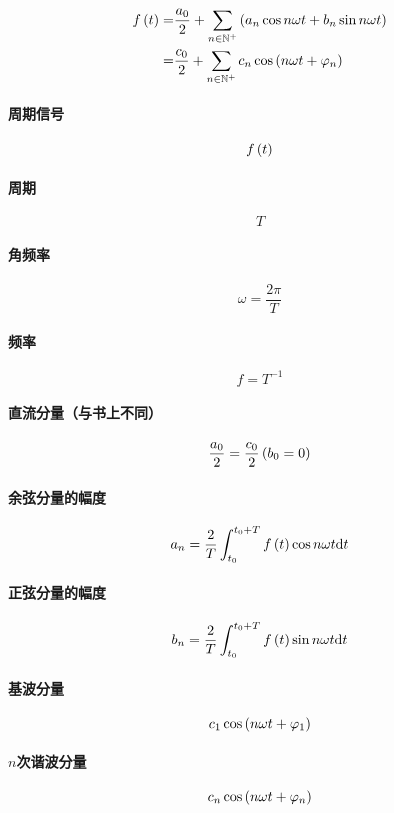 \documentclass{article}
\begin{document}
\[\begin{aligned}
        f\left(t\right)
        = & \frac{a_0}2+\sum_{n\in\mathbb N^+}\left(a_n\cos n\omega t+b_n\sin n\omega t\right) \\
        = & \frac{c_0}2+\sum_{n\in\mathbb N^+}c_n\cos\left(n\omega t+\varphi_n\right)
    \end{aligned}\]

\paragraph{周期信号}\[f\left(t\right)\]

\paragraph{周期}\[T\]

\paragraph{角频率}\[\omega=\frac{2\pi}T\]

\paragraph{频率}\[f=T^{-1}\]

\paragraph{直流分量（与书上不同）}\[\frac{a_0}2=\frac{c_0}2\left(b_0=0\right)\]

\paragraph{余弦分量的幅度}

\[a_n=\frac2T\int_{t_0}^{t_0+T}f\left(t\right)\cos n\omega t\mathrm d t\]

\paragraph{正弦分量的幅度}

\[b_n=\frac2T\int_{t_0}^{t_0+T}f\left(t\right)\sin n\omega t\mathrm d t\]

\paragraph{基波分量}\[c_1\cos\left(n\omega t+\varphi_1\right)\]

\paragraph{$n$次谐波分量}\[c_n\cos\left(n\omega t+\varphi_n\right)\]
\end{document}

